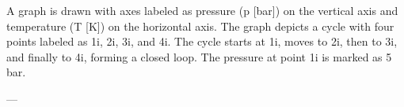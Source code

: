 A graph is drawn with axes labeled as pressure (p [bar]) on the vertical axis and temperature (T [K]) on the horizontal axis. The graph depicts a cycle with four points labeled as 1i, 2i, 3i, and 4i. The cycle starts at 1i, moves to 2i, then to 3i, and finally to 4i, forming a closed loop. The pressure at point 1i is marked as 5 bar.

---